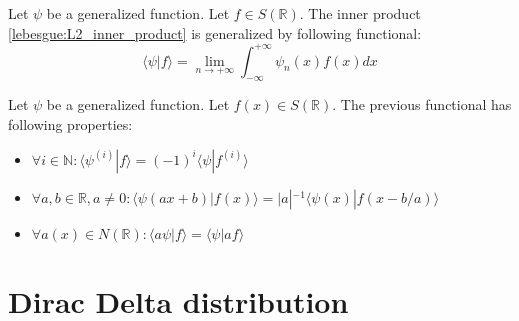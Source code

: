     \begin{notation}
		Let $\psi$ be a generalized function. Let $f\in S(\mathbb{R})$. The inner product \ref{lebesgue:L2_inner_product} is generalized by following functional:
        \begin{equation}
			\langle \psi|f \rangle = \lim_{n\rightarrow+\infty}\int_{-\infty}^{+\infty}\psi_n(x)f(x)dx
		\end{equation}
	\end{notation}
    
    \begin{property}
		Let $\psi$ be a generalized function. Let $f(x)\in S(\mathbb{R})$. The previous functional has following properties:
        \begin{itemize}
			\item \label{distribution:gf_prop1}$\forall i\in\mathbb{N}: \langle \psi^{(i)}|f \rangle = (-1)^i \langle \psi|f^{(i)} \rangle$
            \item $\forall a,b\in\mathbb{R}, a\neq0: \langle \psi(ax+b)|f(x) \rangle = |a|^{-1}\langle \psi(x)|f(x - b/a) \rangle$
            \item $\forall a(x)\in N(\mathbb{R}):\langle a\psi|f \rangle = \langle \psi|af \rangle$
		\end{itemize}
	\end{property}
    

\section{Dirac Delta distribution}

